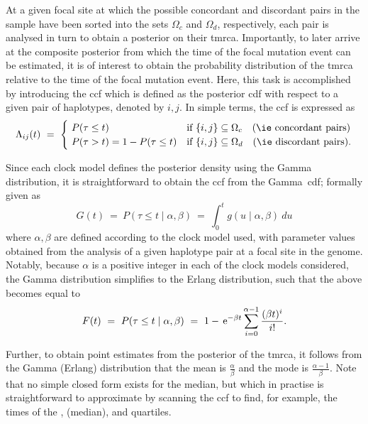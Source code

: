 At a given focal site at which the possible concordant and discordant pairs in the sample have been sorted into the sets $\Omega_c$ and $\Omega_d$, respectively, each pair is analysed in turn to obtain a posterior on their \gls{tmrca}.
Importantly, to later arrive at the composite posterior from which the time of the focal mutation event can be estimated, it is of interest to obtain the probability distribution of the \gls{tmrca} relative to the time of the focal mutation event.
Here, this task is accomplished by introducing the \gls{ccf} which is defined as the posterior \gls{cdf} with respect to a given pair of haplotypes, denoted by ${i,j}$.
In simple terms, the \gls{ccf} is expressed as
\begin{equation}\label{eq:cumcoalfunc}
	\Lambda_{ij}(t)~=~
	\begin{cases}
    ~ P(\tau \leq t)                  & \text{if}~{\{i,j\} \subseteq \Omega_c}\quad\text{(\ie concordant pairs)} \\
    ~ P(\tau >    t)=1-P(\tau \leq t) & \text{if}~{\{i,j\} \subseteq \Omega_d}\quad\text{(\ie discordant pairs)}\text{.}
  \end{cases}
\end{equation}

Since each clock model defines the posterior density using the Gamma distribution, it is straightforward to obtain the \gls{ccf} from the Gamma~\gls{cdf}; formally given as
\begin{equation}
	G(t)~=~P(\tau \leq t \mid\alpha,\beta)~=~\int_{0}^{t}g(u\mid\alpha,\beta)~du
\end{equation}
where $\alpha,\beta$ are defined according to the clock model used, with parameter values obtained from the analysis of a given haplotype pair at a focal site in the genome.
Notably, because $\alpha$ is a positive integer in each of the clock models considered, the Gamma distribution simplifies to the Erlang distribution, such that the above becomes equal to \citep{papoulis2002probability}
\begin{equation}
	F(t)~=~P(\tau \leq t \mid\alpha,\beta)~=~1-\,\mathrm{e}^{-\beta t}\sum_{i=0}^{\alpha-1}\frac{(\beta t)^i}{i!}\text{.}
\end{equation}

Further, to obtain point estimates from the posterior of the \gls{tmrca},
it follows from the Gamma (Erlang) distribution that the mean is $\frac{\alpha}{\beta}$ and the mode is $\frac{\alpha-1}{\beta}$.
Note that no simple closed form exists for the median, but which in practise is straightforward to approximate by scanning the \gls{ccf} to find, for example, the times of the ,  (\ie median), and  quartiles.


